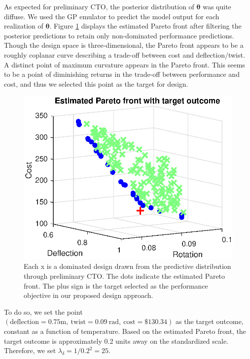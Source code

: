 \documentclass[12pt]{article}
\begin{document}
%
As expected for preliminary CTO, the posterior distribution of $\boldsymbol\theta$ was quite diffuse.
%
We used the GP emulator to predict the model output for each realization of $\boldsymbol \theta$.
%
Figure \ref{fig:elbow} displays the estimated Pareto front after filtering the posterior predictions to retain only non-dominated performance predictions.
%
Though the design space is three-dimensional, the Pareto front appears to be a roughly coplanar curve describing a trade-off between cost and deflection/twist.
%
A distinct point of maximum curvature appears in the Pareto front.
%
This seems to be a point of diminishing returns in the trade-off between performance and cost, and thus we selected this point as the target for design.
%
\begin{figure}
\centering
\includegraphics[scale=0.8]{FIG_est_PF_with_des_obs.eps}
\caption{Each x is a dominated design drawn from the predictive distribution through preliminary CTO. The dots indicate the estimated Pareto front. The plus sign is the target selected as the performance objective in our proposed design approach.}
\label{fig:elbow}
\end{figure}
%
To do so, we set the point $(\mathrm{deflection}=0.75\mathrm m,\
\mathrm{twist}=0.09\ \mathrm{rad},\
\mathrm{cost}=\$130.34)$
 as the target outcome, constant as a function of temperature.
%
Based on the estimated Pareto front, the target outcome is approximately 0.2 units away on the standardized scale.
%
Therefore, we set $\lambda_\delta=1/0.2^2=25.$
%
\end{document}
